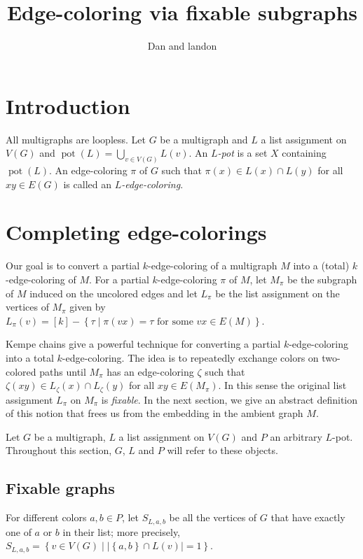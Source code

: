 \documentclass[12pt]{article}
\theoremstyle{plain}
\theoremstyle{definition}
\theoremstyle{remark}
\newcommand{\set}[1]{\left\{ #1 \right\}}
\newcommand{\setb}[3]{\left\{ #1 \in #2 \mid #3 \right\}}
\newcommand{\setbs}[2]{\left\{ #1 \mid #2 \right\}}
\newcommand{\card}[1]{\left|#1\right|}
\newcommand{\irange}[1]{\left[#1\right]}
\newcommand{\pot}{\operatorname{pot}}
\begin{document}
\title{Edge-coloring via fixable subgraphs}
\author{Dan and landon}
\maketitle

\section{Introduction}
All multigraphs are loopless.  Let $G$ be a multigraph and $L$ a list assignment on $V(G)$ and $\pot(L) = \bigcup_{v\in V(G)} L(v)$. An \emph{$L$-pot} is a set $X$ containing $\pot(L)$. 
An edge-coloring $\pi$ of $G$ such that $\pi(x) \in L(x) \cap L(y)$ for all $xy \in E(G)$ is called an \emph{$L$-edge-coloring}.

\section{Completing edge-colorings}
Our goal is to convert a partial $k$-edge-coloring of a multigraph $M$ into a (total) $k$-edge-coloring of $M$.  For a partial $k$-edge-coloring $\pi$ of $M$, let $M_\pi$ be the subgraph of $M$ induced on the uncolored edges and let $L_\pi$ be the list assignment on the vertices of $M_\pi$ given by 
$L_\pi(v) = \irange{k} - \setbs{\tau}{\pi(vx) = \tau \text{ for some  } vx \in E(M)}$. 

Kempe chains give a powerful technique for converting a partial $k$-edge-coloring into a total $k$-edge-coloring.  The idea is to repeatedly exchange colors on two-colored paths until $M_\pi$ has an edge-coloring $\zeta$ such that $\zeta(xy) \in L_\zeta(x) \cap L_\zeta(y)$ for all $xy \in E(M_\pi)$.  In this sense the original list assignment $L_\pi$ on $M_\pi$ is \emph{fixable}. In the next section, we give an abstract definition of this notion that frees us from the embedding in the ambient graph $M$.

Let $G$ be a multigraph, $L$ a list assignment on $V(G)$ and $P$ an arbitrary $L$-pot.  Throughout this section, $G$, $L$ and $P$ will refer to these objects.

\subsection{Fixable graphs}
For different colors $a,b \in P$, let $S_{L,a,b}$ be all the vertices of $G$ that have exactly one of $a$ or $b$ in their list; more precisely, $S_{L,a,b} = \setb{v}{V(G)}{\card{\set{a,b} \cap L(v)} = 1}$.  
\end{document}
